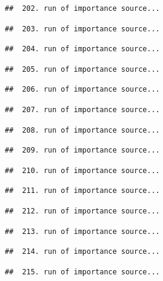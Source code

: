 \documentclass[
]{article}
\begin{document}
\begin{verbatim}
##  202. run of importance source...
\end{verbatim}

\begin{verbatim}
##  203. run of importance source...
\end{verbatim}

\begin{verbatim}
##  204. run of importance source...
\end{verbatim}

\begin{verbatim}
##  205. run of importance source...
\end{verbatim}

\begin{verbatim}
##  206. run of importance source...
\end{verbatim}

\begin{verbatim}
##  207. run of importance source...
\end{verbatim}

\begin{verbatim}
##  208. run of importance source...
\end{verbatim}

\begin{verbatim}
##  209. run of importance source...
\end{verbatim}

\begin{verbatim}
##  210. run of importance source...
\end{verbatim}

\begin{verbatim}
##  211. run of importance source...
\end{verbatim}

\begin{verbatim}
##  212. run of importance source...
\end{verbatim}

\begin{verbatim}
##  213. run of importance source...
\end{verbatim}

\begin{verbatim}
##  214. run of importance source...
\end{verbatim}

\begin{verbatim}
##  215. run of importance source...
\end{verbatim}
\end{document}
